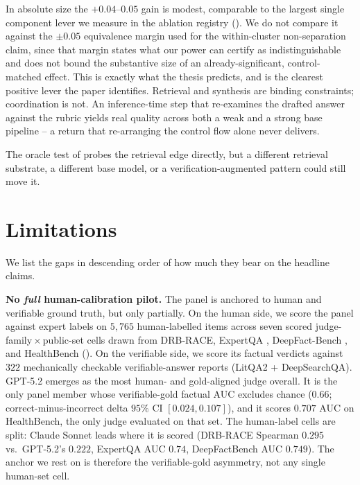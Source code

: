 \documentclass[11pt]{article}
\begin{document}
In absolute size the
$+0.04$--$0.05$ gain is modest, comparable to the largest single component lever we measure
in the ablation registry (). We do not compare it against the
$\pm0.05$ equivalence margin used for the within-cluster non-separation claim, since that margin
states what our power can certify as indistinguishable and does not bound the substantive size of
an already-significant, control-matched effect. This is exactly what the
thesis predicts, and is the clearest positive lever the paper identifies. Retrieval and
synthesis are binding constraints; coordination is not. An inference-time step that
re-examines the drafted answer against the rubric yields real quality across both a weak
and a strong base pipeline -- a return that re-arranging the control flow alone never
delivers.

The oracle test of  probes the retrieval edge directly, but a different
retrieval substrate, a different base model, or a verification-augmented pattern could still
move it.
\section{Limitations}\label{sec:limitations}
We list the gaps in descending order of how much they bear on the headline claims.

\textbf{No \emph{full} human-calibration pilot.} The panel is anchored to human and
verifiable ground truth, but only partially. On the human side, we score the panel against
expert labels on $5{,}765$ human-labelled items across seven scored
judge-family\,$\times$\,public-set cells drawn from DRB-RACE, ExpertQA
\citep{malaviya2024expertqa}, DeepFact-Bench \citep{huang2026deepfact}, and HealthBench
(). On the verifiable side, we score its factual verdicts against
$322$ mechanically checkable verifiable-answer reports (LitQA2 + DeepSearchQA). GPT-5.2
emerges as the most human- and gold-aligned judge overall. It is the only panel member whose
verifiable-gold factual AUC excludes chance ($0.66$; correct-minus-incorrect delta $95\%$ CI
$[0.024,0.107]$), and it scores $0.707$ AUC on HealthBench, the only judge evaluated on that
set. The human-label cells are split: Claude Sonnet leads where it is scored (DRB-RACE
Spearman $0.295$ vs.\ GPT-5.2's $0.222$, ExpertQA AUC $0.74$, DeepFactBench AUC $0.749$). The anchor
we rest on is therefore the verifiable-gold asymmetry, not any single human-set cell.
\end{document}

